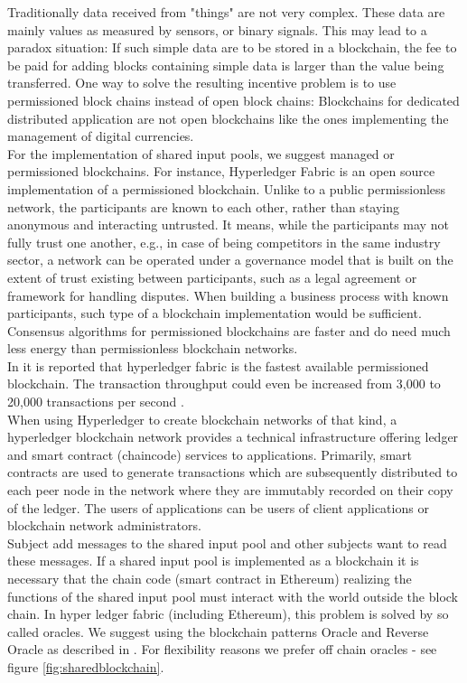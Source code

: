 Traditionally data received from "things" are not very complex. These data are mainly values as measured by sensors, or binary signals. This may lead to a paradox situation: If such simple data are to be stored in a blockchain, the fee to be paid for adding blocks containing simple data is larger than the value being transferred.
One way to solve the resulting incentive problem is to use permissioned block chains instead of open block chains: Blockchains for dedicated distributed application are not open blockchains like the ones implementing the management of digital currencies.
\\
For the implementation of shared input pools, we suggest managed or permissioned blockchains. For instance, Hyperledger Fabric \cite{article:hyperledger} is an open source implementation of a permissioned blockchain. Unlike to a public permissionless network, the participants are known to each other, rather than staying anonymous and interacting untrusted. It means, while the participants may not fully trust one another, e.g., in case of being competitors in the same industry sector, a network can be operated under a governance model that is built on the extent of trust existing between participants, such as a legal agreement or framework for handling disputes. When building a business process with known participants, such type of a blockchain implementation would be sufficient. Consensus algorithms for permissioned blockchains are faster and do need much less energy than permissionless blockchain networks.
\\
In \cite{article:Blockbench} it is reported that hyperledger fabric is the fastest available permissioned blockchain. The transaction throughput could even be increased from 3,000 to 20,000 transactions per second \cite{article:hyperledgerfabric}.
\\
When using Hyperledger to create blockchain networks of that kind, a hyperledger blockchain network provides a technical infrastructure offering ledger and smart contract (chaincode) services to applications. Primarily, smart contracts are used to generate transactions which are subsequently distributed to each peer node in the network where they are immutably recorded on their copy of the ledger. The users of applications can be users of client applications or blockchain network administrators.
\\
Subject add messages to the shared input pool and other subjects want to read these messages. If a shared input pool is implemented as a blockchain it is necessary that the chain code (smart contract in Ethereum) realizing the functions of the shared input pool must interact with the world outside the block chain. In hyper ledger fabric (including Ethereum), this problem is solved by so called oracles. We suggest using the blockchain patterns Oracle and Reverse Oracle as described in \cite{book:Blockchainapplications}. For flexibility reasons we prefer off chain oracles - see figure \ref{fig:sharedblockchain}.



